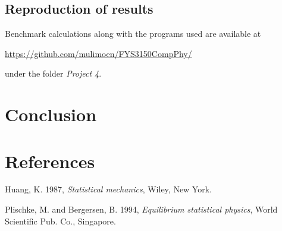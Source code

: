 \documentclass[11pt,a4paper,english,draft]{article}
\numberwithin{equation}{section}
\begin{document}
\subsection{Reproduction of results}

Benchmark calculations along with the programs used are available at

\url{https://github.com/mulimoen/FYS3150CompPhy/}

under the folder \emph{Project 4}.

\section{Conclusion}

\section{References}
Huang, K. 1987, \emph{Statistical mechanics}, Wiley, New York. 

Plischke, M. and Bergersen, B. 1994, \emph{Equilibrium statistical physics}, World Scientific Pub. Co., Singapore.
\end{document}
